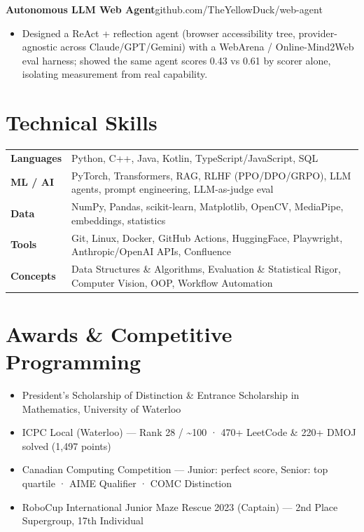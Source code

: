 \documentclass[letterpaper,11pt]{article}
\newcommand{\project}[3]{%
  \textbf{#1}\enspace{\small\textcolor{accent!55}{\textbar}\enspace #2}\hfill{\small #3}\par%
}
\newenvironment{bullets}
  {\begin{itemize}[leftmargin=1.5em,labelsep=0.5em,itemsep=1pt,topsep=1pt,parsep=0pt,partopsep=0pt]\small}
  {\end{itemize}\vspace{1pt}}
\begin{document}
\project{Autonomous LLM Web Agent}{Python, Playwright}{github.com/TheYellowDuck/web-agent}
\begin{bullets}
  \item Designed a ReAct + reflection agent (browser accessibility tree, provider-agnostic across Claude/GPT/Gemini) with a WebArena / Online-Mind2Web eval harness; showed the same agent scores 0.43 vs 0.61 by scorer alone, isolating measurement from real capability.
\end{bullets}

\section{Technical Skills}
\begin{tabularx}{\textwidth}{@{}l X@{}}
  \textbf{Languages} & Python, C++, Java, Kotlin, TypeScript/JavaScript, SQL\\
  \textbf{ML / AI} & PyTorch, Transformers, RAG, RLHF (PPO/DPO/GRPO), LLM agents, prompt engineering, LLM-as-judge eval\\
  \textbf{Data} & NumPy, Pandas, scikit-learn, Matplotlib, OpenCV, MediaPipe, embeddings, statistics\\
  \textbf{Tools} & Git, Linux, Docker, GitHub Actions, HuggingFace, Playwright, Anthropic/OpenAI APIs, Confluence\\
  \textbf{Concepts} & Data Structures \& Algorithms, Evaluation \& Statistical Rigor, Computer Vision, OOP, Workflow Automation\\
\end{tabularx}

\section{Awards \& Competitive Programming}
\begin{bullets}
  \item President's Scholarship of Distinction \& Entrance Scholarship in Mathematics, University of Waterloo
  \item ICPC Local (Waterloo) --- Rank 28 / \textasciitilde100 · 470+ LeetCode \& 220+ DMOJ solved (1{,}497 points)
  \item Canadian Computing Competition --- Junior: perfect score, Senior: top quartile · AIME Qualifier · COMC Distinction
  \item RoboCup International Junior Maze Rescue 2023 (Captain) --- 2nd Place Supergroup, 17th Individual
\end{bullets}
\end{document}
